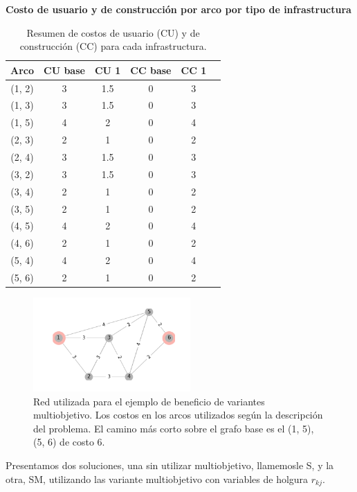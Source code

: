 \documentclass{article}
\begin{document}
  \begin{table}[h!]
    \centering
      \caption*{{\bf Costo de usuario y de construcción por arco por tipo de infrastructura}}
    \begin{tabular}{cccccc}
      \toprule
      Arco & CU base & CU 1 & CC base & CC 1 & \\
      \midrule
        (1, 2) & 3 & 1.5 & 0 & 3 \\
        (1, 3) & 3 & 1.5 & 0 & 3 \\
        (1, 5) & 4 & 2   & 0 & 4 \\
        (2, 3) & 2 & 1   & 0 & 2 \\
        (2, 4) & 3 & 1.5 & 0 & 3 \\
        (3, 2) & 3 & 1.5 & 0 & 3 \\
        (3, 4) & 2 & 1   & 0 & 2 \\
        (3, 5) & 2 & 1   & 0 & 2 \\
        (4, 5) & 4 & 2   & 0 & 4 \\
        (4, 6) & 2 & 1   & 0 & 2 \\
        (5, 4) & 4 & 2   & 0 & 4 \\
        (5, 6) & 2 & 1   & 0 & 2 \\
      \bottomrule
    \end{tabular}
      \caption{Resumen de costos de usuario (CU) y de construcción (CC) para cada infrastructura.}\label{table:example2arccosts}
  \end{table}

  \begin{figure}[h!]
    \centering
    \includegraphics[width=6cm]{../resources/example_2_base.png}
      \caption{Red utilizada para el ejemplo de beneficio de variantes multiobjetivo. Los costos en los arcos utilizados según la descripción del problema. El camino más corto sobre el grafo base es el (1, 5), (5, 6) de costo 6.}
    \label{fig:example2base}
  \end{figure}

  Presentamos dos soluciones, una sin utilizar multiobjetivo, llamemosle S, y la otra, SM, utilizando las variante multiobjetivo con variables de holgura $r_{kj}$.
\end{document}
